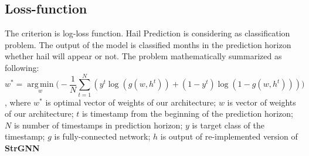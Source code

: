 \documentclass{article}
\DeclareMathOperator*{\argmin}{arg\,min}
\begin{document}
\subsection{Loss-function}
The criterion is  log-loss function. Hail Prediction is considering as classification problem. The output of the model is classified months in the prediction horizon whether hail will appear or not.
The problem mathematically summarized as following:
\begin{equation}
    w^* = \argmin\limits_w \Big ( - \frac{1}{N}\sum\limits_{t = 1 }^{N}(y ^ t \log(g(w, h^t)) + (1 - y ^ t)\log(1 - g(w, h^t)))\Big )
\end{equation}
, where  $w^*$ is optimal vector of weights of our architecture; $w$ is vector of weights of our architecture; $t$ is timestamp from the beginning of the prediction horizon; $N$ is number of timestamps in prediction horizon; $y$ is target class of the timestamp; $g$ is fully-connected network; $h$ is output of re-implemented version of \textbf{StrGNN}~\cite{DBLP:journals/corr/abs-2005-07427}\\




\end{document}

